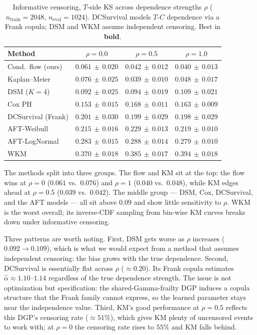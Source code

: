 \begin{table}[t]
\caption{Informative censoring, $T$-side KS across dependence strengths
$\rho$ ($n_{\text{train}} = 2048$, $n_{\text{eval}} = 1024$).
DCSurvival models $T$-$C$ dependence via a Frank copula; DSM and WKM
assume independent censoring. Best in \textbf{bold}.}
\label{tab:inf-bigN}
\centering
\small
\begin{tabular}{lccc}
\toprule
Method & $\rho = 0.0$ & $\rho = 0.5$ & $\rho = 1.0$ \\
\midrule
Cond.\ flow (ours)     & $\mathbf{0.061\,{\pm}\,0.020}$ & $0.042\,{\pm}\,0.012$ & $\mathbf{0.040\,{\pm}\,0.013}$ \\
Kaplan--Meier          & $0.076\,{\pm}\,0.025$ & $\mathbf{0.039\,{\pm}\,0.010}$ & $0.048\,{\pm}\,0.017$ \\
DSM ($K{=}4$)          & $0.092\,{\pm}\,0.025$ & $0.094\,{\pm}\,0.019$ & $0.109\,{\pm}\,0.021$ \\
Cox PH                 & $0.153\,{\pm}\,0.015$ & $0.168\,{\pm}\,0.011$ & $0.163\,{\pm}\,0.009$ \\
DCSurvival (Frank)     & $0.201\,{\pm}\,0.030$ & $0.199\,{\pm}\,0.029$ & $0.198\,{\pm}\,0.029$ \\
AFT-Weibull            & $0.215\,{\pm}\,0.016$ & $0.229\,{\pm}\,0.013$ & $0.219\,{\pm}\,0.010$ \\
AFT-LogNormal          & $0.283\,{\pm}\,0.015$ & $0.288\,{\pm}\,0.014$ & $0.279\,{\pm}\,0.010$ \\
WKM                    & $0.370\,{\pm}\,0.018$ & $0.385\,{\pm}\,0.017$ & $0.394\,{\pm}\,0.018$ \\
\bottomrule
\end{tabular}
\end{table}

The methods split into three groups. The flow and KM sit at the top:
the flow wins at $\rho = 0$ ($0.061$ vs.\ $0.076$) and $\rho = 1$
($0.040$ vs.\ $0.048$), while KM edges ahead at $\rho = 0.5$ ($0.039$
vs.\ $0.042$). The middle group --- DSM, Cox, DCSurvival, and the AFT
models --- all sit above $0.09$ and show little sensitivity to $\rho$.
WKM is the worst overall; its inverse-CDF sampling from bin-wise KM
curves breaks down under informative censoring.

Three patterns are worth noting. First, DSM gets worse as $\rho$
increases ($0.092 \to 0.109$), which is what we would expect from a
method that assumes independent censoring: the bias grows with the
true dependence. Second, DCSurvival is essentially flat across $\rho$
($\approx 0.20$). Its Frank copula estimates
$\hat\alpha \approx 1.10$--$1.14$ regardless of the true dependence
strength. The issue is not optimization but specification: the
shared-Gamma-frailty DGP induces a copula structure that the Frank
family cannot express, so the learned parameter stays near the
independence value. Third, KM's good performance at $\rho = 0.5$
reflects this DGP's censoring rate ($\approx 51\%$), which gives KM
plenty of uncensored events to work with; at $\rho = 0$ the censoring
rate rises to $55\%$ and KM falls behind.

